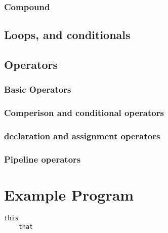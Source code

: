 \documentclass[11pt]{article}
\begin{document}
\subsubsection{Compound}
\subsection{Loops, and conditionals}
\subsection{Operators}
\subsubsection{Basic Operators}
\subsubsection{Comperison and conditional operators}
\subsubsection{declaration and assignment operators}
\subsubsection{Pipeline operators}


\section{Example Program}
\begin{lstlisting}
this
	that
\end{lstlisting}

\end{document}
